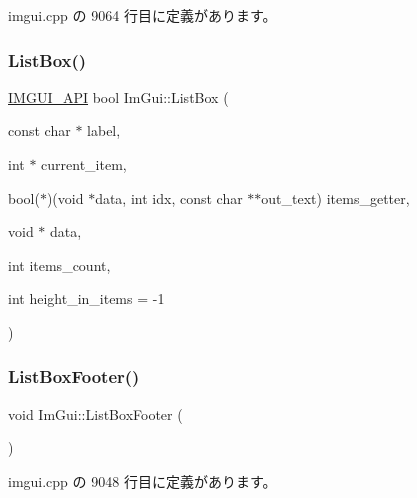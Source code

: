  imgui.\+cpp の 9064 行目に定義があります。

\mbox{\label{namespace_im_gui_ab5865b671bfa22738fac9ffd214470e2}} 
\subsubsection{\texorpdfstring{List\+Box()}{ListBox()}\hspace{0.1cm}{\footnotesize\ttfamily [2/2]}}
{\footnotesize\ttfamily \mbox{\hyperlink{imgui_8h_a43829975e84e45d1149597467a14bbf5}{I\+M\+G\+U\+I\+\_\+\+A\+PI}} bool Im\+Gui\+::\+List\+Box (\begin{DoxyParamCaption}\item[{const char $\ast$}]{label,  }\item[{int $\ast$}]{current\+\_\+item,  }\item[{bool($\ast$)(void $\ast$data, int idx, const char $\ast$$\ast$out\+\_\+text)}]{items\+\_\+getter,  }\item[{void $\ast$}]{data,  }\item[{int}]{items\+\_\+count,  }\item[{int}]{height\+\_\+in\+\_\+items = {\ttfamily -\/1} }\end{DoxyParamCaption})}

\mbox{\label{namespace_im_gui_a9a0a8f6a4a67280dce7bd91310a83a03}} 
\subsubsection{\texorpdfstring{List\+Box\+Footer()}{ListBoxFooter()}}
{\footnotesize\ttfamily void Im\+Gui\+::\+List\+Box\+Footer (\begin{DoxyParamCaption}{ }\end{DoxyParamCaption})}



 imgui.\+cpp の 9048 行目に定義があります。

